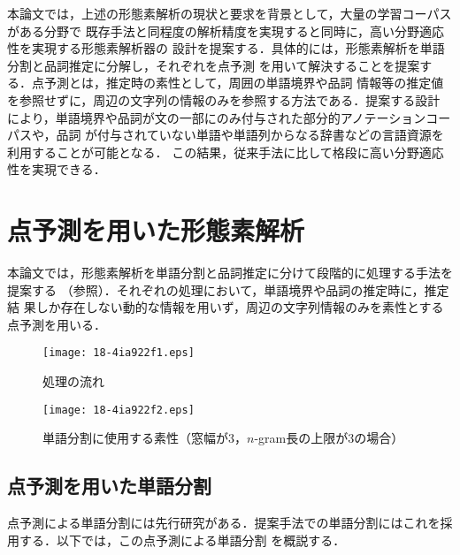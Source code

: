 \documentclass[japanese]{jnlp_1.4}
\def\figref#1{}
\begin{document}
本論文では，上述の形態素解析の現状と要求を背景として，大量の学習コーパスがある分野で
既存手法と同程度の解析精度を実現すると同時に，高い分野適応性を実現する形態素解析器の
設計を提案する．具体的には，形態素解析を単語分割と品詞推定に分解し，それぞれを点予測
を用いて解決することを提案する．点予測とは，推定時の素性として，周囲の単語境界や品詞
情報等の推定値を参照せずに，周辺の文字列の情報のみを参照する方法である．提案する設計
により，単語境界や品詞が文の一部にのみ付与された部分的アノテーションコーパスや，品詞
が付与されていない単語や単語列からなる辞書などの言語資源を利用することが可能となる．
この結果，従来手法に比して格段に高い分野適応性を実現できる．


\section{点予測を用いた形態素解析}
\label{sec:KyPt}

本論文では，形態素解析を単語分割と品詞推定に分けて段階的に処理する手法を提案する
（\figref{figure:flow}参照）．それぞれの処理において，単語境界や品詞の推定時に，推定結
果しか存在しない動的な情報を用いず，周辺の文字列情報のみを素性とする点予測を用いる．

\begin{figure}[b]
  \begin{center}
\texttt{[image: 18-4ia922f1.eps]}
  \end{center}
  \caption{処理の流れ}
  \label{figure:flow}
\end{figure}
\begin{figure}[b]
  \begin{center}
\texttt{[image: 18-4ia922f2.eps]}
  \end{center}
  \caption{単語分割に使用する素性（窓幅が3，$n$-gram長の上限が3の場合）}
  \label{figure:KyWS}
\end{figure}




\subsection{点予測を用いた単語分割}

点予測による単語分割には先行研究\cite{点推定と能動学習を用いた自動単語分割器の分野適
応}がある．提案手法での単語分割にはこれを採用する．以下では，この点予測による単語分割
を概説する．
\end{document}
